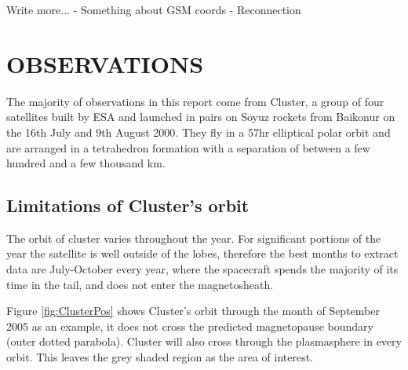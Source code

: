 \documentclass[12pt]{article}
\begin{document}
Write more... 
- Something about GSM coords
- Reconnection

\section{OBSERVATIONS}
The majority of observations in this report come from Cluster, a group of four satellites built by ESA and launched in pairs on Soyuz rockets from Baikonur on the 16th July and 9th August 2000. They fly in a 57hr elliptical polar orbit and are arranged in a tetrahedron formation with a separation of between a few hundred and a few thousand km.

\subsection{Limitations of Cluster's orbit}
The orbit of cluster varies throughout the year. For significant portions of the year the satellite is well outside of the lobes, therefore the best months to extract data are July-October every year, where the spacecraft spends the majority of its time in the tail, and does not enter the magnetosheath. 

Figure \ref{fig:ClusterPos} shows Cluster's orbit through the month of September 2005 as an example, it does not cross the predicted magnetopause boundary (outer dotted parabola). Cluster will also cross through the plasmasphere in every orbit. This leaves the grey shaded region as the area of interest.
\end{document}
